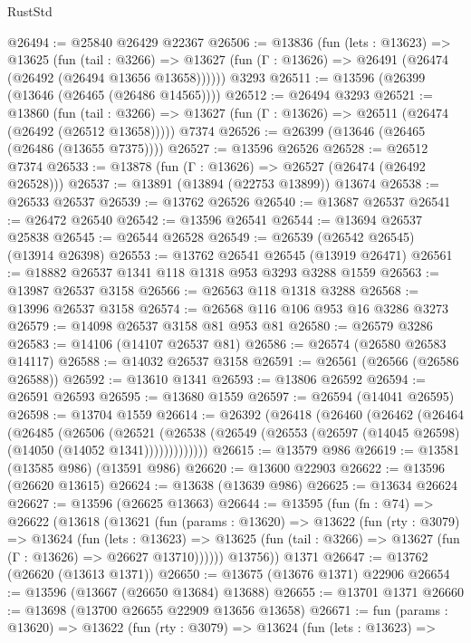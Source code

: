 \begin{lexlean}{RustStd}
\begin{coremodule}
@26494 := @25840 @26429 @22367
@26506 := @13836
    (fun (lets : @13623) =>
    @13625
      (fun (tail : @3266) =>
      @13627 (fun (Γ : @13626) => @26491 (@26474 (@26492 (@26494 @13656 @13658))))))
    @3293
@26511 := @13596 (@26399 (@13646 (@26465 (@26486 @14565))))
@26512 := @26494 @3293
@26521 := @13860
    (fun (tail : @3266) => @13627 (fun (Γ : @13626) => @26511 (@26474 (@26492 (@26512 @13658)))))
    @7374
@26526 := @26399 (@13646 (@26465 (@26486 (@13655 @7375))))
@26527 := @13596 @26526
@26528 := @26512 @7374
@26533 := @13878 (fun (Γ : @13626) => @26527 (@26474 (@26492 @26528)))
@26537 := @13891 (@13894 (@22753 @13899)) @13674
@26538 := @26533 @26537
@26539 := @13762 @26526
@26540 := @13687 @26537
@26541 := @26472 @26540
@26542 := @13596 @26541
@26544 := @13694 @26537 @25838
@26545 := @26544 @26528
@26549 := @26539 (@26542 @26545) (@13914 @26398)
@26553 := @13762 @26541 @26545 (@13919 @26471)
@26561 := @18882 @26537 @1341 @118 @1318 @953 @3293 @3288 @1559
@26563 := @13987 @26537 @3158
@26566 := @26563 @118 @1318 @3288
@26568 := @13996 @26537 @3158
@26574 := @26568 @116 @106 @953 @16 @3286 @3273
@26579 := @14098 @26537 @3158 @81 @953 @81
@26580 := @26579 @3286
@26583 := @14106 (@14107 @26537 @81)
@26586 := @26574 (@26580 @26583 @14117)
@26588 := @14032 @26537 @3158
@26591 := @26561 (@26566 (@26586 @26588))
@26592 := @13610 @1341
@26593 := @13806 @26592
@26594 := @26591 @26593
@26595 := @13680 @1559
@26597 := @26594 (@14041 @26595)
@26598 := @13704 @1559
@26614 := @26392
    (@26418
      (@26460
        (@26462
          (@26464
            (@26485
              (@26506
                (@26521
                  (@26538 (@26549 (@26553 (@26597 (@14045 @26598) (@14050 (@14052 @1341)))))))))))))
@26615 := @13579 @986
@26619 := @13581 (@13585 @986) (@13591 @986)
@26620 := @13600 @22903
@26622 := @13596 (@26620 @13615)
@26624 := @13638 (@13639 @986)
@26625 := @13634 @26624
@26627 := @13596 (@26625 @13663)
@26644 := @13595
    (fun (fn : @74) =>
    @26622
      (@13618
        (@13621
          (fun (params : @13620) =>
          @13622
            (fun (rty : @3079) =>
            @13624
              (fun (lets : @13623) =>
              @13625 (fun (tail : @3266) => @13627 (fun (Γ : @13626) => @26627 @13710))))))
        @13756))
    @1371
@26647 := @13762 (@26620 (@13613 @1371))
@26650 := @13675 (@13676 @1371) @22906
@26654 := @13596 (@13667 (@26650 @13684) @13688)
@26655 := @13701 @1371
@26660 := @13698 (@13700 @26655 @22909 @13656 @13658)
@26671 := fun (params : @13620) =>
  @13622
    (fun (rty : @3079) =>
    @13624
      (fun (lets : @13623) =>

\end{coremodule}
\end{lexlean}
